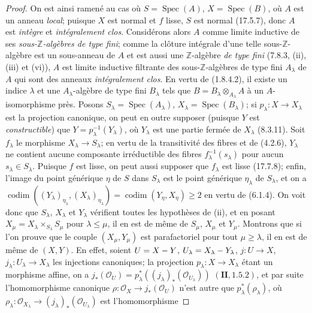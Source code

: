 \begin{proof}
On est ainsi ramené au cas où $S=\operatorname{Spec}(A)$,
$X=\operatorname{Spec}(B)$, où $A$ est un anneau \emph{local}; puisque $X$ est
normal et $f$ lisse, $S$ est normal (17.5.7), donc $A$ est \emph{intègre} et
\emph{intégralement clos}. Considérons alors $A$ comme limite inductive de ses
\emph{sous-$\mathbb Z$-algèbres de type fini}; comme la clôture intégrale d'une telle
sous-$\mathbb Z$-algèbre est un sous-anneau de $A$ et est aussi une
$\mathbb Z$-algèbre \emph{de type fini} (7.8.3, (ii), (iii) et (vi)), $A$ est limite inductive
filtrante des sous-$\mathbb Z$-algèbres de type fini $A_\lambda$ de $A$ qui sont des
anneaux \emph{intégralement clos}. En vertu de (1.8.4.2), il existe un indice
$\lambda$ et une $A_\lambda$-algèbre de type fini $B_\lambda$ tels que $B=B_\lambda\otimes_{A_\lambda}A$
à un $A$-isomorphisme près. Posons $S_\lambda=\operatorname{Spec}(A_\lambda)$,
$X_\lambda=\operatorname{Spec}(B_\lambda)$; si $p_\lambda:X\to X_\lambda$ est la
projection canonique, on peut en outre supposer (puisque $Y$ est
\emph{constructible}) que $Y=p_\lambda^{-1}(Y_\lambda)$, où $Y_\lambda$ est une
partie fermée de $X_\lambda$ (8.3.11). Soit $f_\lambda$ le morphisme
$X_\lambda\to S_\lambda$; en vertu de la transitivité des fibres et de (4.2.6),
$Y_\lambda$ ne contient aucune composante irréductible des fibres
$f_\lambda^{-1}(s_\lambda)$ pour aucun $s_\lambda\in S_\lambda$. Puisque $f$ est
lisse, on peut aussi supposer que $f_\lambda$ est lisse (17.7.8); enfin, l'image du
point générique $\eta$ de $S$ dans $S_\lambda$ est le point générique $\eta_\lambda$
de $S_\lambda$, et on a
$\operatorname{codim}((Y_\lambda)_{\eta_\lambda},(X_\lambda)_{\eta_\lambda})=\operatorname{codim}(Y_\eta,X_\eta)\geq2$
en vertu de (6.1.4). On voit donc que $S_\lambda$, $X_\lambda$ et $Y_\lambda$
vérifient toutes les hypothèses de (ii), et en posant
$X_\mu=X_\lambda\times_{S_\lambda}S_\mu$ pour $\lambda\leq\mu$, il en est de même de
$S_\mu$, $X_\mu$ et $Y_\mu$. Montrons que si l'on prouve que le couple
$(X_\mu,Y_\mu)$ est parafactoriel pour tout $\mu\geq\lambda$, il en est de même de
$(X,Y)$. En effet, soient $U=X- Y$, $U_\lambda=X_\lambda- Y_\lambda$, $j:U\to X$,
$j_\lambda:U_\lambda\to X_\lambda$ les injections canoniques; la projection
$p_\lambda:X\to X_\lambda$ étant un morphisme affine, on a
$j_*(\mathcal O_U)=p_\lambda^*((j_\lambda)_*(\mathcal O_{U_\lambda}))$ $(\mathbf{II}, 1.5.2)$,
et par suite l'homomorphisme canonique
$\rho:\mathcal O_X\to j_*(\mathcal O_U)$ n'est autre que $p_\lambda^*(\rho_\lambda)$, où
$\rho_\lambda:\mathcal O_{X_\lambda}\to(j_\lambda)_*(\mathcal O_{U_\lambda})$ est l'homomorphisme

\end{proof}
